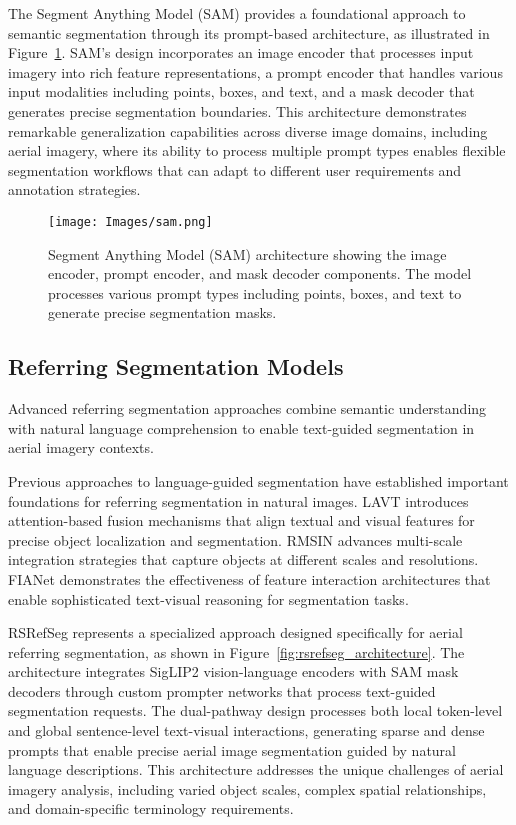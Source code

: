 The Segment Anything Model (SAM) provides a foundational approach to semantic segmentation through its prompt-based architecture, as illustrated in Figure~\ref{fig:sam_architecture}. SAM's design incorporates an image encoder that processes input imagery into rich feature representations, a prompt encoder that handles various input modalities including points, boxes, and text, and a mask decoder that generates precise segmentation boundaries. This architecture demonstrates remarkable generalization capabilities across diverse image domains, including aerial imagery, where its ability to process multiple prompt types enables flexible segmentation workflows that can adapt to different user requirements and annotation strategies.

\begin{figure}[htbp]
\centering
\texttt{[image: Images/sam.png]}
\caption{Segment Anything Model (SAM) architecture showing the image encoder, prompt encoder, and mask decoder components. The model processes various prompt types including points, boxes, and text to generate precise segmentation masks.}
\label{fig:sam_architecture}
\end{figure}

\subsection{Referring Segmentation Models}

Advanced referring segmentation approaches combine semantic understanding with natural language comprehension to enable text-guided segmentation in aerial imagery contexts.

Previous approaches to language-guided segmentation have established important foundations for referring segmentation in natural images. LAVT introduces attention-based fusion mechanisms that align textual and visual features for precise object localization and segmentation. RMSIN advances multi-scale integration strategies that capture objects at different scales and resolutions. FIANet demonstrates the effectiveness of feature interaction architectures that enable sophisticated text-visual reasoning for segmentation tasks.

RSRefSeg represents a specialized approach designed specifically for aerial referring segmentation, as shown in Figure~\ref{fig:rsrefseg_architecture}. The architecture integrates SigLIP2 vision-language encoders with SAM mask decoders through custom prompter networks that process text-guided segmentation requests. The dual-pathway design processes both local token-level and global sentence-level text-visual interactions, generating sparse and dense prompts that enable precise aerial image segmentation guided by natural language descriptions. This architecture addresses the unique challenges of aerial imagery analysis, including varied object scales, complex spatial relationships, and domain-specific terminology requirements.

